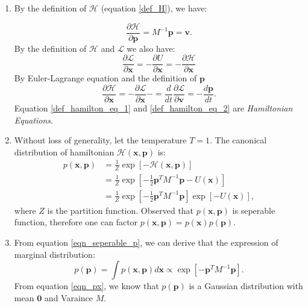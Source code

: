 \documentclass{article}
\begin{document}
\begin{enumerate}
\item 
By the definition of $\mathcal{H}$ (equation \ref{def_H}), we have:

\begin{equation}\label{def_hamilton_eq_1}
\frac{\partial \mathcal{H}}{\partial \textbf{p}} = M^{-1} \textbf{p} =  \textbf{v}.
\end{equation}
By the definition of $\mathcal{H}$ and $\mathcal{L}$ we also have:
\begin{equation}
\frac{\partial \mathcal{L}}{\partial \textbf{x}} = -\frac{\partial U}{\partial \textbf{x}} = -\frac{\partial \mathcal{H}}{\partial \textbf{x}}
\end{equation}
By Euler-Lagrange equation and the definition of $\textbf{p}$
\begin{equation}\label{def_hamilton_eq_2}
\frac{\partial \mathcal{H}}{\partial \textbf{x}} = -\frac{\partial \mathcal{L}}{\partial \textbf{x}} - =\frac{d}{d t} \frac{\partial \mathcal{L}}{\partial \textbf{v}} = -\frac{d \textbf{{p}}}{d t}.
\end{equation}
Equation \ref{def_hamilton_eq_1} and \ref{def_hamilton_eq_2} are \textit{Hamiltonian Equations}.
\pagebreak

\item 
Without loss of generality, let the temperature $T=1$. The canonical distribution of hamiltonian $\mathcal{H (\textbf{x},\textbf{p})}$ is:
\begin{align}
p(\textbf{x},\textbf{p})&=\frac{1}{Z} \exp[ -\mathcal{H (\textbf{x},\textbf{p})} ] \\
&=\frac{1}{Z} \exp [-\frac{1}{2}\textbf{p}^T M^{-1} \textbf{p} - U(\textbf{x})] \nonumber \\
&=\frac{1}{Z}\exp [-\frac{1}{2} \textbf{p}^T M^{-1} \textbf{p}]\exp [-U(\textbf{x})] \label{eqn_seperable_p},
\end{align}
where $Z$ is the partition function.  Observed that $p(\textbf{x},\textbf{p})$ is seperable function, therefore one can factor $p(\textbf{x},\textbf{p})= p(\textbf{x})p(\textbf{p})$.
\pagebreak

\item 
From equation \ref{eqn_seperable_p}, we can derive that the expression of marginal distribution: 
\begin{equation}\label{eqn_px}
p(\textbf{p}) = \int p(\textbf{x}, \textbf{p}) d\textbf{x} \propto  \exp [-\textbf{p}^T M^{-1} \textbf{p} ].
\end{equation}
From equation \ref{eqn_px}, we know that $p(\textbf{p})$ is a Gaussian distribution with mean $\textbf{0}$ and Varaince $M$.
\pagebreak


\end{enumerate}
\end{document}
